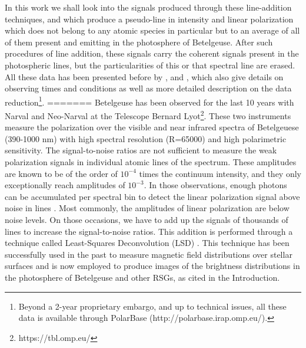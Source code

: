 \documentclass{aa}
\begin{document}
In this work we shall look into the signals produced through these line-addition techniques, and which produce a pseudo-line in intensity 
and linear polarization which does not belong to any atomic species in particular but to an average of all of them present and emitting in the 
photosphere of Betelgeuse. After such procedures of line addition, these signals carry the coherent signals present in the photospheric lines, but the particularities of this or 
that spectral line are erased. All these data has been presented before by \cite{auriere_discovery_2016}, \cite{mathias_evolution_2018} and 
\cite{lopez_ariste_three-dimensional_2022}, which also give details on observing times and conditions as well as more detailed description 
on the data reduction\footnote[1]{Beyond a 2-year proprietary embargo, and up to technical issues, all these data is available through 
PolarBase (http://polarbase.irap.omp.eu/).}.
=======
Betelgeuse has been observed for the last 10 years with Narval and Neo-Narval at the Telescope Bernard Lyot\footnote[1]{https://tbl.omp.eu/}. These two instruments measure the polarization 
over the visible and near infrared spectra of Betelgeuese (390-1000 nm) with high spectral resolution (R=65000) and high polarimetric sensitivity. The signal-to-noise ratios are not sufficient to measure the weak polarization signals in individual atomic lines of the 
spectrum. These amplitudes are known to be of the order of $10^{-4}$ times the continuum intensity, and they only exceptionally reach amplitudes of $10^{-3}$. In those observations, enough photons can be accumulated per spectral bin to 
detect the linear polarization signal above noise in lines \citep{auriere_discovery_2016}. Most commonly, the amplitudes of linear polarization are below noise levels. On those 
occasions, we have to add up the signals of thousands of lines to increase the signal-to-noise ratios. This addition 
is performed through a technique called Least-Squares Deconvolution (LSD) \citep{donati_spectropolarimetric_1997}.%
This technique has been successfully used in the past to measure 
magnetic field distributions over stellar surfaces and is now employed to produce images of the brightness distributions in the photosphere 
of Betelgeuse and other RSGs, as cited in the Introduction. 
\end{document}
